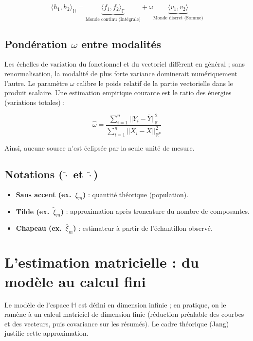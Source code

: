 \documentclass[11pt, a4paper]{article}
\begin{document}
\begin{equation}
\langle h_1, h_2 \rangle_{\mathbb{H}} = \underbrace{\langle f_1, f_2 \rangle_{\mathbb{F}}}_{\text{Monde continu (Intégrale)}} + \omega \underbrace{\langle v_1, v_2 \rangle}_{\text{Monde discret (Somme)}}
\end{equation}

\subsection{Pondération $\omega$ entre modalités}
Les échelles de variation du fonctionnel et du vectoriel diffèrent en général ;
sans renormalisation, la modalité de plus forte variance dominerait
numériquement l'autre. Le paramètre $\omega$ calibre le poids relatif
de la partie vectorielle dans le produit scalaire. Une estimation empirique
courante est le ratio des énergies (variations totales) :

\begin{equation}
\hat{\omega} = \frac{\sum_{i=1}^n ||Y_i - \bar{Y}||_{\mathbb{F}}^2}{\sum_{i=1}^n ||X_i - \bar{X}||_{\mathbb{R}^p}^2}
\end{equation}

Ainsi, aucune source n'est éclipsée par la seule unité de mesure.

\subsection*{Notations ($\hat{\cdot}$ et $\tilde{\cdot}$)}
\begin{itemize}
    \item \textbf{Sans accent (ex.\ $\xi_m$)} : quantité théorique (population).
    \item \textbf{Tilde (ex.\ $\tilde{\xi}_m$)} : approximation après troncature
    du nombre de composantes.
    \item \textbf{Chapeau (ex.\ $\hat{\xi}_m$)} : estimateur à partir de
    l'échantillon observé.
\end{itemize}


\section{L'estimation matricielle : du modèle au calcul fini}

Le modèle de l'espace $\mathbb{H}$ est défini en dimension infinie ; en
pratique, on le ramène à un calcul matriciel de dimension finie (réduction
préalable des courbes et des vecteurs, puis covariance sur les résumés). Le
cadre théorique (Jang) justifie cette approximation.
\end{document}
